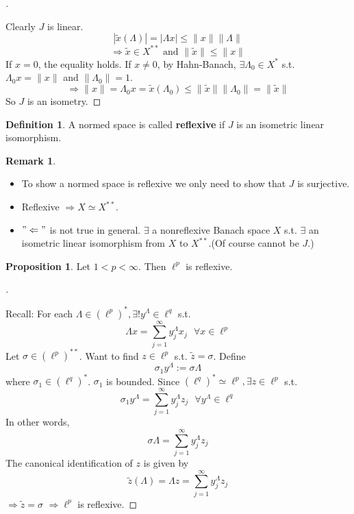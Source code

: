 \documentclass{article}
\newcommand{\sfa}{\text{  } \forall}
\theoremstyle{definition}
\newtheorem{dfn}{Definition}
\newtheorem{rem}{Remark}
\newtheorem{prop}{Proposition}
\newenvironment{proofs}[1][\proofname]{%
  \begin{proof}[#1]$ $\par\nobreak\ignorespaces
}{%
  \end{proof}
}
\begin{document}
\begin{proofs}
	Clearly $J$ is linear.
	\[
		|\tilde{x}(\Lambda)| = |\Lambda x | \leq \|x\| \|\Lambda\|
	\]
	\[
		\Rightarrow \tilde{x} \in X^{**} \text{ and }\|\tilde{x}\| \leq \|x\|
	\]
	If $x = 0$, the equality holds.
	If $x \neq 0$, by Hahn-Banach, $\exists \Lambda_0 \in X^*$ s.t. $\Lambda_0 x = \|x\|$ and $\|\Lambda_0\| = 1$.
	\[
		\Rightarrow \|x\| = \Lambda_0 x = \tilde{x}(\Lambda_0) \leq \|\tilde{x}\|\|\Lambda_0\| = \|\tilde{x}\|
	\]
	So $J$ is an isometry.
\end{proofs}

\begin{dfn}
	A normed space is called \textbf{reflexive} if $J$ is an isometric linear isomorphism.
\end{dfn}

\begin{rem}
	\begin{itemize}
		\item To show a normed space is reflexive we only need to show that $J$ is surjective.

		\item Reflexive $\Rightarrow X \simeq X^{**}$.
			
		\item $"\Leftarrow"$ is  not true in general.
			$\exists$ a nonreflexive Banach space $X$ s.t. $\exists$ an isometric linear isomorphism from $X$ to $X^{**}$.(Of course cannot be $J$.)
	\end{itemize}
\end{rem}

\begin{prop}
	Let $1 < p < \infty$.
	Then $\ell^p$ is reflexive.
\end{prop}

\begin{proofs}
	Recall: For each $\Lambda \in (\ell^p)^*, \exists !y^{\Lambda} \in \ell^q$ s.t.
	\[
		\Lambda x = \sum_{j = 1}^\infty y_j^{\Lambda} x_j \sfa x \in \ell^p
	\]
	Let $\sigma \in (\ell^p)^{**}$.
	Want to find $z \in \ell^p$ s.t. $\tilde{z} = \sigma$.
	Define 
	\[
		\sigma_1 y^{\Lambda} := \sigma \Lambda
	\]
	where $\sigma_1 \in (\ell^q)^*$.
	$\sigma_1$ is bounded.
	Since $(\ell^q)^* \simeq \ell^p, \exists z \in \ell^p$ s.t.
	\[
		\sigma_1 y^{\Lambda} = \sum_{j =1}^\infty y_j^{\Lambda} z_j \sfa y^{\Lambda} \in \ell^q
	\]
	In other words,
	\[
		\sigma \Lambda = \sum_{j = 1}^\infty y_j^{\Lambda} z_j
	\]
	The canonical identification of $z$ is given by 
	\[
		\tilde{z}(\Lambda) = \Lambda z = \sum_{j = 1}^\infty y_j^{\Lambda} z_j
	\]
	$\Rightarrow \tilde{z} = \sigma$
	$\Rightarrow \ell^p$ is reflexive.
\end{proofs}
\end{document}
